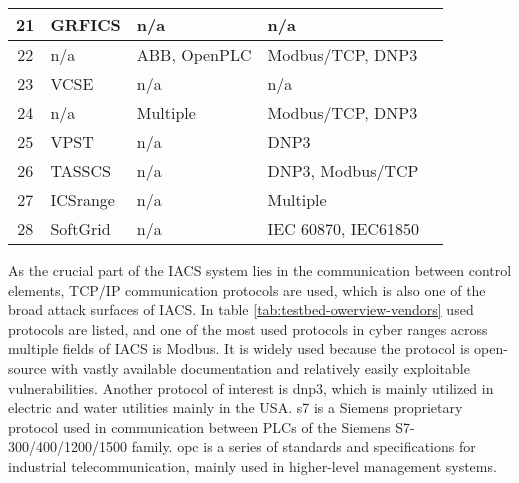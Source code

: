 \begin{longtable}[c]{|c|l|p{}|p{}|p{}|}
	21           & GRFICS        & n/a                              & n/a                                            & \cite{39-grfics-scada-simulator}                   \\ \hline
	22           & n/a           & ABB, OpenPLC                     & Modbus/TCP, DNP3                                   & \cite{40-scada-testbed}                            \\ \hline
	23           & VCSE          & n/a                              & n/a                                            & \cite{41-vcse-ics-testbed}                         \\ \hline
	24           & n/a           & Multiple                         & Modbus/TCP, DNP3                                   & \cite{43-SCADA-testbed-for-protection-concepts}    \\ \hline
	25           & VPST          & n/a                              & DNP3                                           & \cite{46-VPST-testbed-2009}                        \\ \hline
	26           & TASSCS        & n/a                              & DNP3, Modbus/TCP                                   & \cite{47-ieee-tasscs-testbed}                      \\ \hline
	27           & ICSrange      & n/a                              & Multiple                                       & \cite{48-red-tee-ics-testbed}                      \\ \hline
	28           & SoftGrid      & n/a                              & IEC 60870, IEC61850                            & \cite{50-softgrid-scada-testbed}                   \\ \hline
	
\end{longtable}

As the crucial part of the IACS system lies in the communication between control elements, TCP/IP communication protocols are used, which is also one of the broad attack surfaces of IACS. In table \ref{tab:testbed-owerview-vendors} used protocols are listed, and one of the most used protocols in cyber ranges across multiple fields of IACS is Modbus. It is widely used because the protocol is open-source with vastly available documentation and relatively easily exploitable vulnerabilities. Another protocol of interest is \gls*{dnp3}, which is mainly utilized in electric and water utilities mainly in the USA. \gls*{s7} is a Siemens proprietary protocol used in communication between PLCs of the Siemens S7-300/400/1200/1500 family. \gls*{opc} is a series of standards and specifications for industrial telecommunication, mainly used in higher-level management systems.  

